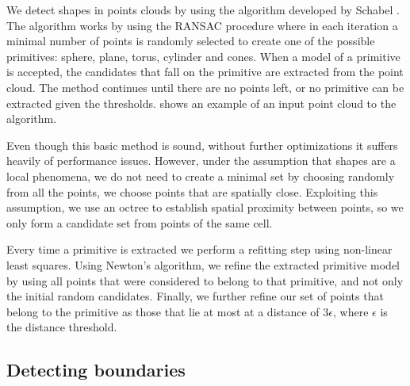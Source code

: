 \documentclass[10pt, conference]{IEEEtran}
\begin{document}
We detect shapes in points clouds by using the algorithm developed by Schabel \cite{schnabel07}. The algorithm works by using the RANSAC procedure where in each iteration a minimal number of points is randomly selected to create one of the possible primitives: sphere, plane, torus, cylinder and cones. When a model of a primitive is accepted, the candidates that fall on the primitive are extracted from the point cloud. The method continues until there are no points left, or no primitive can be extracted given the thresholds.  shows an example of an input point cloud to the algorithm.

Even though this basic method is sound, without further optimizations it suffers heavily of performance issues. However, under the assumption that shapes are a local phenomena, we do not need to create a minimal set by choosing randomly from all the points, we choose points that are spatially close. Exploiting this assumption, we use an octree to establish spatial proximity between points, so we only form a candidate set from points of the same cell.

Every time a primitive is extracted we perform a refitting step using non-linear least squares. Using Newton's algorithm, we refine the extracted primitive model by using all points that were considered to belong to that primitive, and not only the initial random candidates. Finally, we further refine our set of points that belong to the primitive as those that lie at most at a distance of $3\epsilon$, where $\epsilon$ is the distance threshold.


\subsection{Detecting boundaries}
\end{document}
